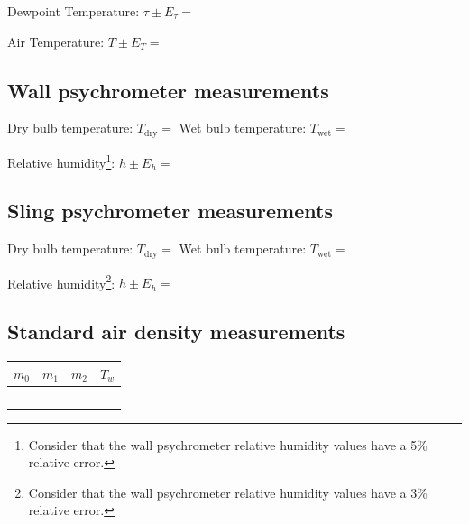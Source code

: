 \documentclass{article}
\begin{document}
\vspace{5mm}

Dewpoint Temperature: $\tau \pm E_\tau = $ \underline{\hspace{4cm}}

\vspace{5mm}

Air Temperature: $T \pm E_T = $ \underline{\hspace{4cm}}


\subsection{Wall psychrometer measurements}

Dry bulb temperature: $T_{\mbox{dry}}=$ \underline{\hspace{3cm}}  \hspace{1cm}
Wet bulb temperature: $T_{\mbox{wet}}=$ \underline{\hspace{3cm}}

\vspace{5mm}

Relative humidity\footnote{Consider that the wall psychrometer relative humidity values have a 5\% relative error.}: $h \pm E_h= $\underline{\hspace{3cm}}


\subsection{Sling psychrometer measurements}

Dry bulb temperature: $T_{\mbox{dry}}=$ \underline{\hspace{3cm}}  \hspace{1cm}
Wet bulb temperature: $T_{\mbox{wet}}=$ \underline{\hspace{3cm}}

\vspace{5mm}

Relative humidity\footnote{Consider that the wall psychrometer relative humidity values have a 3\% relative error.}: $h \pm E_h = $\underline{\hspace{3cm}}


\subsection{Standard air density measurements}


\begin{tabular}{|c|c|c|c|}
\hline
$m_0$&$m_1$&$m_2$&$T_w$\\
\hline
~\hspace{2.5cm}~&~\hspace{2.5cm}~&~\hspace{2.5cm}~&~\hspace{2.5cm}~\\
\hline
\end{tabular}
\end{document}
